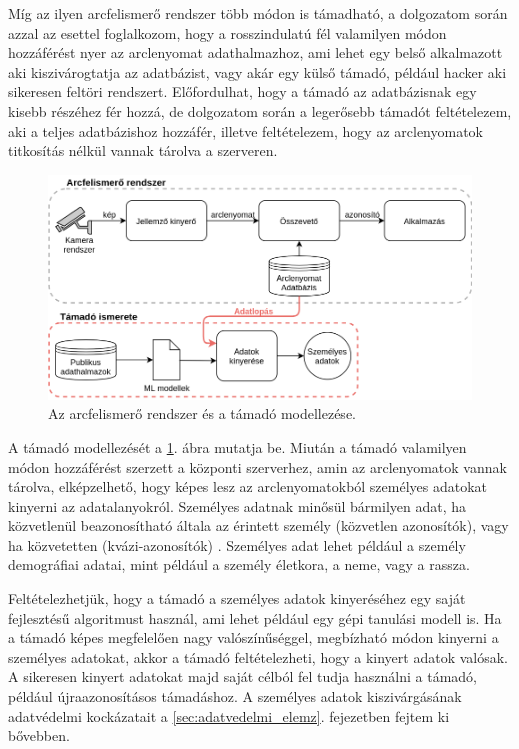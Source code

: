Míg az ilyen arcfelismerő rendszer több módon is támadható, a dolgozatom során azzal az esettel foglalkozom, hogy a rosszindulatú fél valamilyen módon hozzáférést nyer az arclenyomat adathalmazhoz, ami lehet egy belső alkalmazott aki kiszivárogtatja az adatbázist, vagy akár egy külső támadó, például hacker aki sikeresen feltöri rendszert. Előfordulhat, hogy a támadó az adatbázisnak egy kisebb részéhez fér hozzá, de dolgozatom során a legerősebb támadót feltételezem, aki a teljes adatbázishoz hozzáfér, illetve feltételezem, hogy az arclenyomatok titkosítás nélkül vannak tárolva a szerveren.

\begin{figure}[ht]
	\centering
	\includegraphics[width=1\columnwidth]{figures/attacker_model.png}
	\caption{Az arcfelismerő rendszer és a támadó modellezése.}
	\label{fig:attacker}
\end{figure}

A támadó modellezését a \ref{fig:attacker}. ábra mutatja be. Miután a támadó valamilyen módon hozzáférést szerzett a központi szerverhez, amin az arclenyomatok vannak tárolva, elképzelhető, hogy képes lesz az arclenyomatokból személyes adatokat kinyerni az adatalanyokról. Személyes adatnak minősül bármilyen adat, ha közvetlenül beazonosítható általa az érintett személy (közvetlen azonosítók), vagy ha közvetetten (kvázi-azonosítók) \cite{GDPR2018}. Személyes adat lehet például a személy demográfiai adatai, mint például a személy életkora, a neme, vagy a rassza. 

Feltételezhetjük, hogy a támadó a személyes adatok kinyeréséhez egy saját fejlesztésű algoritmust használ, ami lehet például egy gépi tanulási modell is. Ha a támadó képes megfelelően nagy valószínűséggel, megbízható módon kinyerni a személyes adatokat, akkor a támadó feltételezheti, hogy a kinyert adatok valósak. A sikeresen kinyert adatokat majd saját célból fel tudja használni a támadó, például újraazonosításos támadáshoz. A személyes adatok kiszivárgásának adatvédelmi kockázatait a \ref{sec:adatvedelmi_elemz}. fejezetben fejtem ki bővebben.

